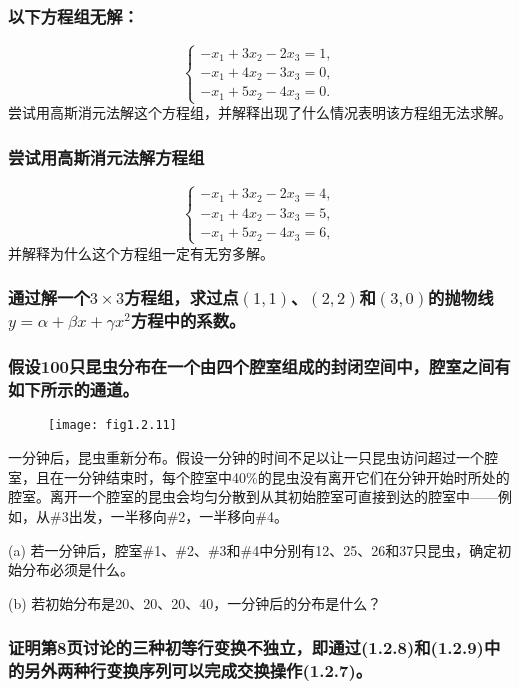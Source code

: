\subsubsection{以下方程组无解：}
\[
\begin{cases}
	-x_1 + 3x_2 - 2x_3 = 1, \\
	-x_1 + 4x_2 - 3x_3 = 0, \\
	-x_1 + 5x_2 - 4x_3 = 0.
\end{cases}
\]
尝试用高斯消元法解这个方程组，并解释出现了什么情况表明该方程组无法求解。

\subsubsection{尝试用高斯消元法解方程组}
\[
\begin{cases}
	-x_1 + 3x_2 - 2x_3 = 4, \\
	-x_1 + 4x_2 - 3x_3 = 5, \\
	-x_1 + 5x_2 - 4x_3 = 6,
\end{cases}
\]
并解释为什么这个方程组一定有无穷多解。

\subsubsection{通过解一个\(3 \times 3\)方程组，求过点\((1,1)\)、\((2,2)\)和\((3,0)\)的抛物线\(y = \alpha + \beta x + \gamma x^2\)方程中的系数。}

\subsubsection{假设100只昆虫分布在一个由四个腔室组成的封闭空间中，腔室之间有如下所示的通道。}

\begin{figure}[h]
	\centering
	\texttt{[image: fig1.2.11]} 
\end{figure}

一分钟后，昆虫重新分布。假设一分钟的时间不足以让一只昆虫访问超过一个腔室，且在一分钟结束时，每个腔室中40\%的昆虫没有离开它们在分钟开始时所处的腔室。离开一个腔室的昆虫会均匀分散到从其初始腔室可直接到达的腔室中——例如，从\#3出发，一半移向\#2，一半移向\#4。

(a) 若一分钟后，腔室\#1、\#2、\#3和\#4中分别有12、25、26和37只昆虫，确定初始分布必须是什么。

(b) 若初始分布是20、20、20、40，一分钟后的分布是什么？

\subsubsection{证明第8页讨论的三种初等行变换不独立，即通过(1.2.8)和(1.2.9)中的另外两种行变换序列可以完成交换操作(1.2.7)。}

